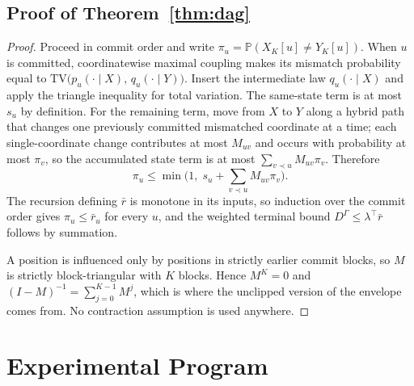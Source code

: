 \documentclass[11pt,a4paper]{article}
\theoremstyle{plain}
\theoremstyle{definition}
\theoremstyle{remark}
\newcommand{\TV}{\mathrm{TV}}
\newcommand{\Prob}{\mathbb{P}}
\begin{document}
\subsection{Proof of Theorem~\ref{thm:dag}}
\begin{proof}
Proceed in commit order and write $\pi_u = \Prob(X_K[u] \neq Y_K[u])$. When $u$
is committed, coordinatewise maximal coupling makes its mismatch probability
equal to $\TV\big(p_u(\cdot \mid X),\, q_u(\cdot \mid Y)\big)$. Insert the
intermediate law $q_u(\cdot \mid X)$ and apply the triangle inequality for total
variation. The same-state term is at most $s_u$ by definition. For the remaining
term, move from $X$ to $Y$ along a hybrid path that changes one previously
committed mismatched coordinate at a time; each single-coordinate change
contributes at most $M_{uv}$ and occurs with probability at most $\pi_v$, so the
accumulated state term is at most $\sum_{v \prec u} M_{uv}\pi_v$. Therefore
\[
  \pi_u \le \min\Big(1,\; s_u + \sum_{v \prec u} M_{uv}\pi_v\Big).
\]
The recursion defining $\bar r$ is monotone in its inputs, so induction over the
commit order gives $\pi_u \le \bar r_u$ for every $u$, and the weighted terminal
bound $D^\Gamma \le \lambda^\top \bar r$ follows by summation.

A position is influenced only by positions in strictly earlier commit blocks, so
$M$ is strictly block-triangular with $K$ blocks. Hence $M^K = 0$ and
$(I-M)^{-1} = \sum_{j=0}^{K-1}M^j$, which is where the unclipped version of the
envelope comes from. No contraction assumption is used anywhere.
\end{proof}

\section{Experimental Program}
\label{app:program}
\end{document}
